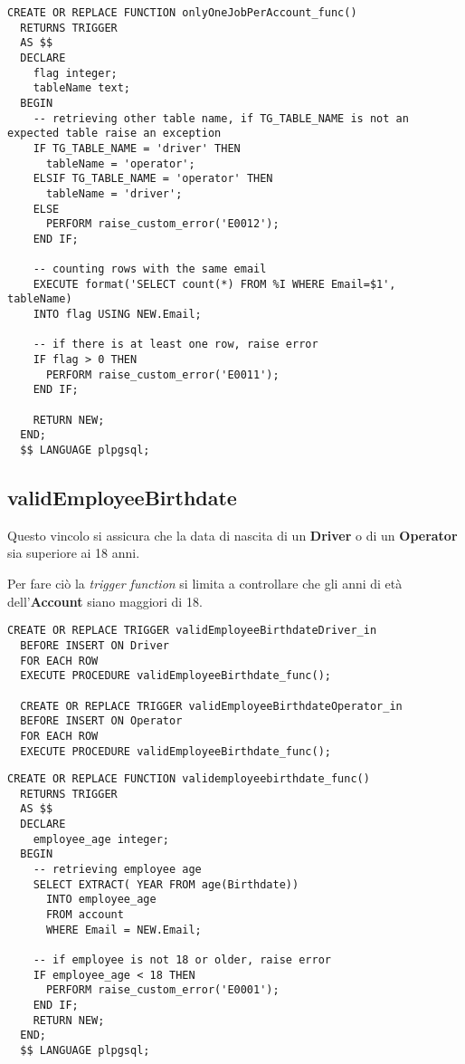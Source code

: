 \begin{lstlisting}[caption={Funzione per il vincolo \textbf{onlyOneJobPerAccount}}]
  CREATE OR REPLACE FUNCTION onlyOneJobPerAccount_func()
  RETURNS TRIGGER
  AS $$
  DECLARE
    flag integer;
    tableName text;
  BEGIN
    -- retrieving other table name, if TG_TABLE_NAME is not an expected table raise an exception
    IF TG_TABLE_NAME = 'driver' THEN
      tableName = 'operator';
    ELSIF TG_TABLE_NAME = 'operator' THEN
      tableName = 'driver';
    ELSE 
      PERFORM raise_custom_error('E0012');
    END IF;

    -- counting rows with the same email
    EXECUTE format('SELECT count(*) FROM %I WHERE Email=$1', tableName) 
    INTO flag USING NEW.Email;

    -- if there is at least one row, raise error
    IF flag > 0 THEN
      PERFORM raise_custom_error('E0011');
    END IF;

    RETURN NEW;
  END;
  $$ LANGUAGE plpgsql;
\end{lstlisting}

\subsection{\textbf{validEmployeeBirthdate}}

Questo vincolo si assicura che la data di nascita di un \textbf{Driver} o di un \textbf{Operator} sia superiore ai 18 anni.

Per fare ciò la \textit{trigger function} si limita a controllare che gli anni di età dell'\textbf{Account} siano maggiori di 18.

\begin{lstlisting}[caption={Trigger per il vincolo \textbf{validEmployeeBirthdate}}]
  CREATE OR REPLACE TRIGGER validEmployeeBirthdateDriver_in
  BEFORE INSERT ON Driver
  FOR EACH ROW
  EXECUTE PROCEDURE validEmployeeBirthdate_func();

  CREATE OR REPLACE TRIGGER validEmployeeBirthdateOperator_in
  BEFORE INSERT ON Operator
  FOR EACH ROW
  EXECUTE PROCEDURE validEmployeeBirthdate_func();
\end{lstlisting}

\begin{lstlisting}[caption={Funzione per il vincolo \textbf{validEmployeeBirthdate}}]
  CREATE OR REPLACE FUNCTION validemployeebirthdate_func()
  RETURNS TRIGGER
  AS $$
  DECLARE
    employee_age integer;
  BEGIN
    -- retrieving employee age
    SELECT EXTRACT( YEAR FROM age(Birthdate))
      INTO employee_age
      FROM account
      WHERE Email = NEW.Email;

    -- if employee is not 18 or older, raise error
    IF employee_age < 18 THEN
      PERFORM raise_custom_error('E0001');
    END IF;
    RETURN NEW;
  END;
  $$ LANGUAGE plpgsql;
\end{lstlisting}

